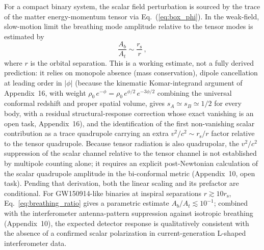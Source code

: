 \documentclass[aps,prd,onecolumn,superscriptaddress,nofootinbib,showpacs,12pt]{revtex4-2}
\newcommand{\rs}{r_{\mathrm{s}}}
\begin{document}
For a compact binary system, the scalar field perturbation
is sourced by the trace of the matter energy-momentum tensor
via Eq.~(\ref{eq:box_phi}).  In the weak-field, slow-motion
limit the breathing mode amplitude relative to the tensor
modes is estimated by~\cite{Lotishvili2026}
\begin{equation}\label{eq:breathing_ratio}
  \frac{A_{b}}{A_{t}} \sim
    \frac{\rs}{r}\,,
\end{equation}
where $r$ is the orbital separation.  This is a working
estimate, not a fully derived prediction: it relies on
monopole absence (mass conservation), dipole cancellation
at leading order in $|\phi|$ (because the kinematic
Komar-integrand argument of Appendix~16, with weight
$\rho_0\,e^{-\phi}=\rho_0\,e^{\phi/2}\,e^{-3\phi/2}$
combining the universal conformal redshift and proper
spatial volume, gives $s_{A} \simeq s_{B} \simeq 1/2$ for
every body, with a residual structural-response
correction whose exact vanishing is an open task,
Appendix~16), and the
identification of the first non-vanishing scalar
contribution as a trace quadrupole carrying an extra
$v^{2}/c^{2}\sim\rs/r$ factor relative to the tensor
quadrupole.  Because tensor radiation is also quadrupolar,
the $v^{2}/c^{2}$ suppression of the scalar channel
relative to the tensor channel is not established by
multipole counting alone; it requires an explicit
post-Newtonian calculation of the scalar quadrupole
amplitude in the bi-conformal metric (Appendix~10, open
task).  Pending that derivation, both the linear scaling
and its prefactor are conditional.  For GW150914-like
binaries at inspiral separations $r\gtrsim 10\rs$,
Eq.~\eqref{eq:breathing_ratio} gives a parametric estimate
$A_{b}/A_{t}\lesssim 10^{-1}$; combined with the
interferometer antenna-pattern suppression against
isotropic breathing (Appendix~10), the expected detector
response is qualitatively consistent with the absence of
a confirmed scalar polarization in current-generation
L-shaped interferometer data.
\end{document}
